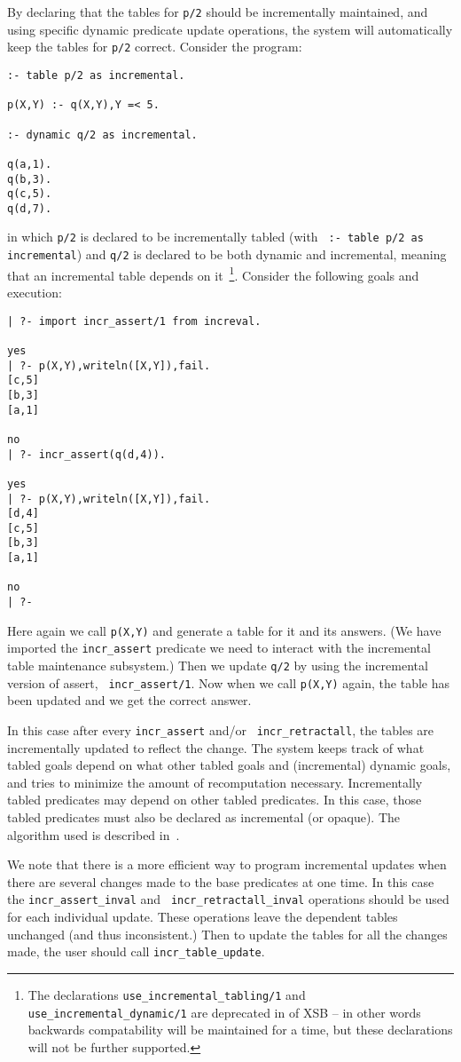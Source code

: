 By declaring that the tables for {\tt p/2} should be incrementally
maintained, and using specific dynamic predicate update operations,
the system will automatically keep the tables for {\tt p/2} correct.
Consider the program:
\begin{verbatim}
:- table p/2 as incremental.

p(X,Y) :- q(X,Y),Y =< 5.

:- dynamic q/2 as incremental.

q(a,1).
q(b,3).
q(c,5).
q(d,7).
\end{verbatim}
in which {\tt p/2} is declared to be incrementally tabled (with {\tt
  :- table p/2 as incremental}) and {\tt q/2} is declared to be both
dynamic and incremental, meaning that an incremental table depends on
it~\footnote{The declarations {\tt use\_incremental\_tabling/1} and
  {\tt use\_incremental\_dynamic/1} are deprecated in \version of XSB
  -- in other words backwards compatability will be maintained for a
  time, but these declarations will not be further supported.}.
Consider the following goals and execution:
\begin{verbatim}
| ?- import incr_assert/1 from increval.

yes
| ?- p(X,Y),writeln([X,Y]),fail.
[c,5]
[b,3]
[a,1]

no
| ?- incr_assert(q(d,4)).

yes
| ?- p(X,Y),writeln([X,Y]),fail.
[d,4]
[c,5]
[b,3]
[a,1]

no
| ?- 
\end{verbatim}
Here again we call {\tt p(X,Y)} and generate a table for it and its
answers.  (We have imported the {\tt incr\_assert} predicate we need
to interact with the incremental table maintenance subsystem.)  Then
we update {\tt q/2} by using the incremental version of assert, {\tt
incr\_assert/1}.  Now when we call {\tt p(X,Y)} again, the table has
been updated and we get the correct answer.

In this case after every {\tt incr\_assert} and/or {\tt
incr\_retractall}, the tables are incrementally updated to reflect the
change.  The system keeps track of what tabled goals depend on what
other tabled goals and (incremental) dynamic goals, and tries to
minimize the amount of recomputation necessary.  Incrementally tabled
predicates may depend on other tabled predicates.  In this case, those
tabled predicates must also be declared as incremental (or opaque).
The algorithm used is described in~\cite{SaRa05,Saha06}.

We note that there is a more efficient way to program incremental
updates when there are several changes made to the base predicates at
one time.  In this case the {\tt incr\_assert\_inval} and {\tt
incr\_retractall\_inval} operations should be used for each individual
update.  These operations leave the dependent tables unchanged (and
thus inconsistent.)  Then to update the tables for all the changes
made, the user should call {\tt incr\_table\_update}.

